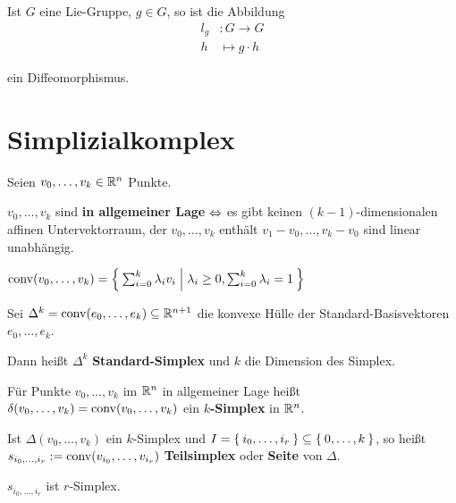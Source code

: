 \begin{bemerkung}
    Ist $G$ eine Lie-Gruppe, $g \in G$, so ist die Abbildung
    \begin{align*}
        l_g &: G \rightarrow G\\
        h  &\mapsto g \cdot h
    \end{align*}

    ein Diffeomorphismus.
\end{bemerkung}

\section{Simplizialkomplex}
\begin{definition}%
    Seien $v_0, \dots, v_k \in \mathbb{R}^n$ Punkte.
    \begin{defenum}
        \item $v_0, \dots, v_k$ sind \textbf{in allgemeiner Lage} $\Leftrightarrow$ es gibt keinen $(k-1)$-dimensionalen
              affinen Untervektorraum, der $v_0, \dots, v_k$ enthält
              \gdw $v_1 - v_0, \dots, v_k - v_0$ sind linear unabhängig.
        \item $\operatorname{conv}(v_0, \dots, v_k) = \Set{\sum_{i=0}^k \lambda_i v_i | \lambda_i \geq 0, \sum_{i=0}^k \lambda_i = 1} $
    \end{defenum}
\end{definition}

\begin{definition}
    \begin{defenum}
        \item Sei $\Delta^k = \operatorname{conv}(e_0, \dots, e_k) \subseteq \mathbb{R}^{n+1}$
              die konvexe Hülle der Standard-Basisvektoren $e_0, \dots, e_k$.

              Dann heißt $\Delta^k$ \textbf{Standard-Simplex}
              und $k$ die Dimension des Simplex.
        \item Für Punkte $v_0, \dots, v_k$ im $\mathbb{R}^n$ in allgemeiner
              Lage heißt $\delta (v_0, \dots, v_k) = \operatorname{conv}(v_0, \dots, v_k)$
              ein \textbf{$k$-Simplex} in $\mathbb{R}^n$.
        \item Ist $\Delta (v_0, \dots, v_k)$ ein $k$-Simplex und
              $I = \Set{i_0, \dots, i_r} \subseteq \Set{0, \dots, k}$,
              so heißt $s_{i_0, \dots, i_r} := \operatorname{conv}(v_{i_0}, \dots, v_{i_r})$
              \textbf{Teilsimplex} oder \textbf{Seite}
              von $\Delta$. 

              $s_{i_0, \dots, i_r}$ ist $r$-Simplex.
    \end{defenum}
\end{definition}

